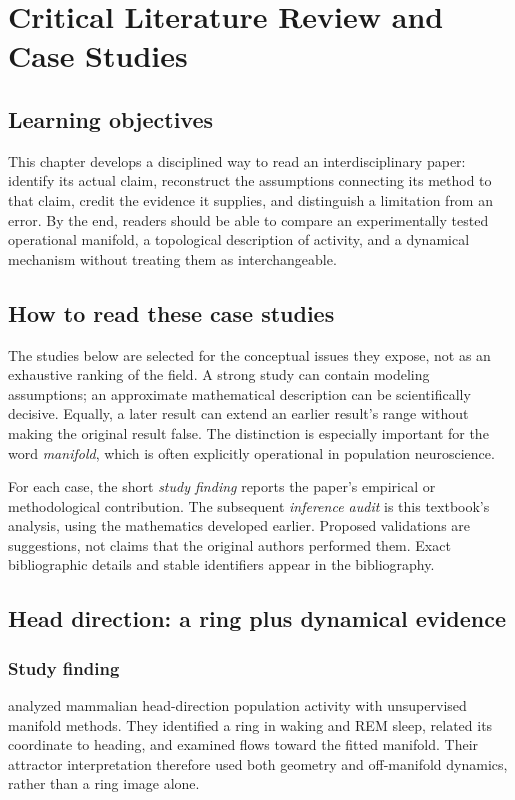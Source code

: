 \chapter{Critical Literature Review and Case Studies}\label{ch:13}

\section*{Learning objectives}
This chapter develops a disciplined way to read an interdisciplinary paper: identify its actual claim, reconstruct the assumptions connecting its method to that claim, credit the evidence it supplies, and distinguish a limitation from an error. By the end, readers should be able to compare an experimentally tested operational manifold, a topological description of activity, and a dynamical mechanism without treating them as interchangeable.

\section{How to read these case studies}
The studies below are selected for the conceptual issues they expose, not as an exhaustive ranking of the field. A strong study can contain modeling assumptions; an approximate mathematical description can be scientifically decisive. Equally, a later result can extend an earlier result's range without making the original result false. The distinction is especially important for the word \emph{manifold}, which is often explicitly operational in population neuroscience.

For each case, the short \emph{study finding} reports the paper's empirical or methodological contribution. The subsequent \emph{inference audit} is this textbook's analysis, using the mathematics developed earlier. Proposed validations are suggestions, not claims that the original authors performed them. Exact bibliographic details and stable identifiers appear in the bibliography.

\section{Head direction: a ring plus dynamical evidence}
\subsection{Study finding}
\citet{app_chaudhuri2019} analyzed mammalian head-direction population activity with unsupervised manifold methods. They identified a ring in waking and REM sleep, related its coordinate to heading, and examined flows toward the fitted manifold. Their attractor interpretation therefore used both geometry and off-manifold dynamics, rather than a ring image alone.

